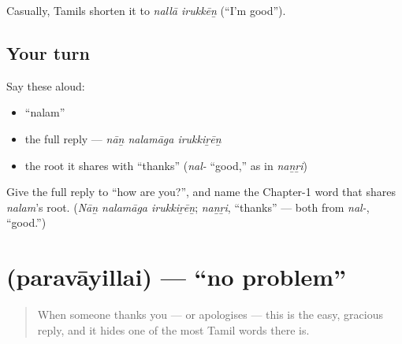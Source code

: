 Casually, Tamils shorten it to \emph{nallā irukkēṉ} (\textquotedblleft{}I'm good\textquotedblright{}).

\subsection*{Your turn}
Say these aloud:

\begin{itemize}
\raggedright
  \item \textquotedblleft{}nalam\textquotedblright{}
  \item the full reply — \emph{nāṉ nalamāga irukkiṟēṉ}
  \item the root it shares with \textquotedblleft{}thanks\textquotedblright{} (\emph{nal-} \textquotedblleft{}good,\textquotedblright{} as in \emph{naṉṟi})
\end{itemize}

\begin{tcolorbox}[breakable,colback=teal!4,colframe=teal!35!black,title={Before you move on}]
Give the full reply to \textquotedblleft{}how are you?\textquotedblright{}, and name the Chapter-1 word that shares \emph{nalam}'s root. (\emph{Nāṉ nalamāga irukkiṟēṉ}; \emph{naṉṟi}, \textquotedblleft{}thanks\textquotedblright{} — both from \emph{nal-}, \textquotedblleft{}good.\textquotedblright{})
\end{tcolorbox}
\section[\texorpdfstring{\ta{பரவாயில்லை} (paravāyillai)}{பரவாயில்லை (paravāyillai)}]{ (paravāyillai) — \textquotedblleft{}no problem\textquotedblright{}}

\label{lesson:TA-C03-paravayillai}



\begin{quote}
When someone thanks you — or apologises — this is the easy, gracious reply, and it hides one of the most Tamil words there is.
\end{quote}

